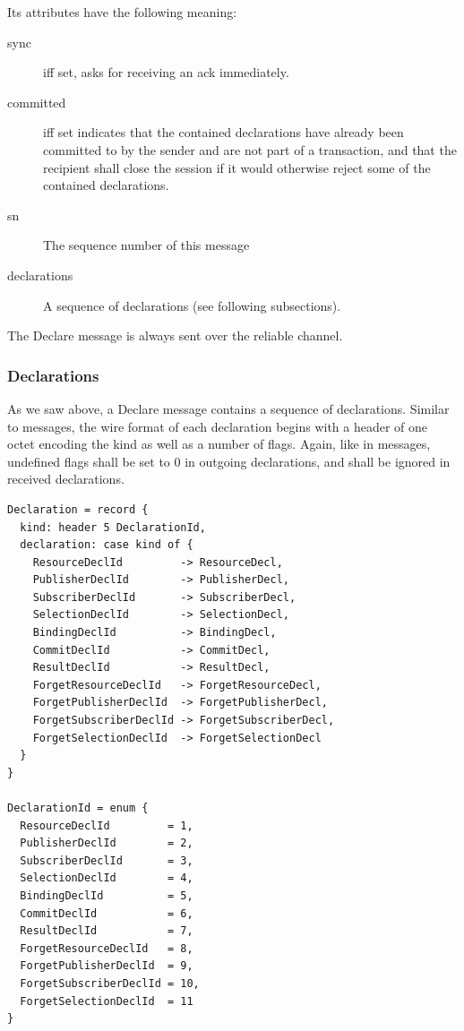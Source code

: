 \documentclass[a4paper,oneside,article]{memoir}
\begin{document}
Its attributes have the following meaning:
\begin{description}
\item[sync] iff set, asks for receiving an ack immediately. 
\item[committed] iff set indicates that the contained declarations have already been committed to by
  the sender and are not part of a transaction, and that the recipient shall close the session if it
  would otherwise reject some of the contained declarations.
\item[sn] The sequence number of this message
\item[declarations] A sequence of declarations (see following subsections).
\end{description}

The Declare message is always sent over the reliable channel.

\subsubsection{Declarations}

As we saw above, a Declare message contains a sequence of declarations.  Similar to messages, the
wire format of each declaration begins with a header of one octet encoding the kind as well as a
number of flags.  Again, like in messages, undefined flags shall be set to 0 in outgoing
declarations, and shall be ignored in received declarations.

\begin{verbatim}
Declaration = record {
  kind: header 5 DeclarationId,
  declaration: case kind of {
    ResourceDeclId         -> ResourceDecl,
    PublisherDeclId        -> PublisherDecl,
    SubscriberDeclId       -> SubscriberDecl,
    SelectionDeclId        -> SelectionDecl,
    BindingDeclId          -> BindingDecl,
    CommitDeclId           -> CommitDecl,
    ResultDeclId           -> ResultDecl,
    ForgetResourceDeclId   -> ForgetResourceDecl,
    ForgetPublisherDeclId  -> ForgetPublisherDecl,
    ForgetSubscriberDeclId -> ForgetSubscriberDecl,
    ForgetSelectionDeclId  -> ForgetSelectionDecl
  }
}

DeclarationId = enum {
  ResourceDeclId         = 1,
  PublisherDeclId        = 2,
  SubscriberDeclId       = 3,
  SelectionDeclId        = 4,
  BindingDeclId          = 5,
  CommitDeclId           = 6,
  ResultDeclId           = 7,
  ForgetResourceDeclId   = 8,
  ForgetPublisherDeclId  = 9,
  ForgetSubscriberDeclId = 10,
  ForgetSelectionDeclId  = 11
}  
\end{verbatim}
\end{document}

